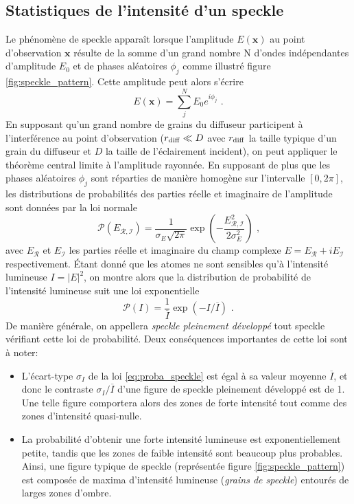 \subsection{Statistiques de l'intensité d'un speckle}
\label{sc:distribution_speckle}
Le phénomène de speckle apparaît lorsque l'amplitude $E(\mathbf{x})$ au point d'observation $\mathbf{x}$ résulte de la somme d'un grand nombre N d'ondes indépendantes d'amplitude $E_0$ et de phases aléatoires $\phi_j$ comme illustré figure \ref{fig:speckle_pattern}. Cette amplitude peut alors s'écrire
\begin{equation}
E(\mathbf{x})=\sum_{j}^{N} E_0 e^{i \phi_j} \text{ .}
\end{equation}
En supposant qu'un grand nombre de grains du diffuseur participent à l'interférence au point d'observation ($r_{\mathrm{diff}} \ll D$ avec $r_{\mathrm{diff}}$ la taille typique d'un grain du diffuseur et $D$ la taille de l'éclairement incident), on peut appliquer le théorème central limite à l'amplitude rayonnée. En supposant de plus que les phases aléatoires $\phi_j$ sont réparties de manière homogène sur l'intervalle $\left[ 0,2\pi \right]$, les distributions de probabilités des parties réelle et imaginaire de l'amplitude sont données par la loi normale
\begin{equation}
\mathcal{P}(E_{\mathcal{R,I}})=\frac{1}{\sigma_E\sqrt{2\pi}} \exp{\left( -\frac{E_{\mathcal{R,I}}^2}{2 \sigma_E^2}\right) } \text{ ,}
\end{equation}
avec $E_{\mathcal{R}}$ et $E_{\mathcal{I}}$ les parties réelle et imaginaire du champ complexe $E=E_{\mathcal{R}} +i E_{\mathcal{I}}$ respectivement. Étant donné que les atomes ne sont sensibles qu'à l'intensité lumineuse $I=\left| E \right| ^2$, on montre alors que la distribution de probabilité de l'intensité lumineuse suit une loi exponentielle \citep{goodman2007speckle}
\begin{equation}
\mathcal{P}(I)=\frac{1}{\overline{I}}\exp{\left( -I/\overline{I} \right) } \text{ .}
\label{eq:proba_speckle}
\end{equation}
De manière générale, on appellera \emph{speckle pleinement développé} tout speckle vérifiant cette loi de probabilité. Deux conséquences importantes de cette loi sont à noter:
\begin{itemize}
\item[\textendash] L'écart-type $\sigma_I$ de la loi \ref{eq:proba_speckle} est égal à sa valeur moyenne $\overline{I}$, et donc le contraste $\sigma_I /\overline{I}$ d'une figure de speckle pleinement développé est de 1. Une telle figure comportera alors des zones de forte intensité tout comme des zones d'intensité quasi-nulle. 
\item[\textendash] La probabilité d'obtenir une forte intensité lumineuse est exponentiellement petite, tandis que les zones de faible intensité sont beaucoup plus probables. Ainsi, une figure typique de speckle (représentée figure \ref{fig:speckle_pattern}) est composée de maxima d'intensité lumineuse (\emph{grains de speckle}) entourés de larges zones d'ombre.
\end{itemize}





